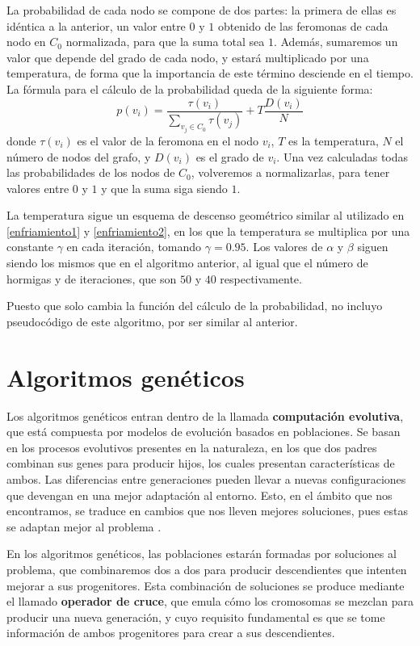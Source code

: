 La probabilidad de cada nodo se compone de dos partes: la primera de ellas es idéntica
a la anterior, un valor entre $0$ y $1$ obtenido de las feromonas de cada nodo en $C_0$
normalizada, para que la suma total sea $1$. Además, sumaremos un valor que depende
del grado de cada nodo, y estará multiplicado por una temperatura, de forma que la
importancia de este término desciende en el tiempo. La fórmula para el cálculo
de la probabilidad queda de la siguiente forma:
\[ p(v_i) = \frac{\tau(v_i)}{\sum\limits_{v_j \in C_0} \tau(v_j)} + T \frac{D(v_i)}{N} \]
donde $\tau(v_i)$ es el valor de la feromona en el nodo $v_i$, $T$ es la temperatura,
$N$ el número de nodos del grafo, y $D(v_i)$ es el grado de $v_i$. Una vez calculadas
todas las probabilidades de los nodos de $C_0$, volveremos a normalizarlas, para tener
valores entre $0$ y $1$ y que la suma siga siendo $1$.

La temperatura sigue un esquema de descenso geométrico similar al utilizado en
\autoref{enfriamiento1} y \autoref{enfriamiento2}, en los que la temperatura se multiplica
por una constante $\gamma$ en cada iteración, tomando $\gamma = 0.95$. Los valores
de $\alpha$ y $\beta$ siguen siendo los mismos que en el algoritmo anterior, al
igual que el número de hormigas y de iteraciones, que son $50$ y $40$ respectivamente.

Puesto que solo cambia la función del cálculo de la probabilidad, no incluyo pseudocódigo
de este algoritmo, por ser similar al anterior.

\section{Algoritmos genéticos}\label{genetico}

Los algoritmos genéticos entran dentro de la llamada \textbf{computación evolutiva},
que está compuesta por modelos de evolución basados en poblaciones. Se basan en
los procesos evolutivos presentes en la naturaleza, en los que dos padres combinan
sus genes para producir hijos, los cuales presentan características de ambos.
Las diferencias entre generaciones pueden llevar a nuevas configuraciones que
devengan en una mejor adaptación al entorno. Esto, en el ámbito que nos encontramos,
se traduce en cambios que nos lleven mejores soluciones, pues estas se adaptan
mejor al problema \citep{herrera:2014}.

En los algoritmos genéticos, las poblaciones estarán formadas por soluciones al
problema, que combinaremos dos a dos para producir descendientes que intenten mejorar
a sus progenitores. Esta combinación de soluciones se produce mediante el llamado
\textbf{operador de cruce}, que emula cómo los cromosomas se mezclan para producir
una nueva generación, y cuyo requisito fundamental es que se tome información de
ambos progenitores para crear a sus descendientes.

